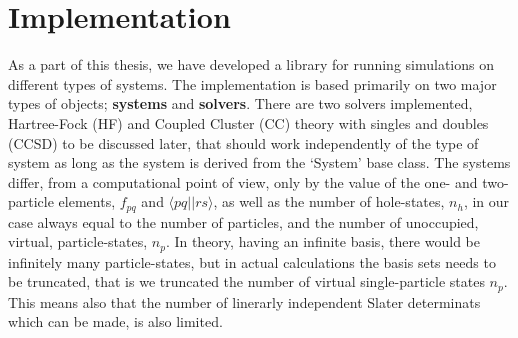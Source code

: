 \section{Implementation}
As a part of this thesis, we have developed a library for running simulations on different types of systems.
The implementation is based primarily on two major types of objects; {\bf systems} and {\bf solvers}.
There are two solvers implemented, Hartree-Fock (HF)  and Coupled Cluster (CC) theory with singles and doubles (CCSD) to be discussed later, that should work independently of the type of system as long as the system is derived from the `System' base class.
The systems differ, from a computational point of view, only by the value of the one- and two-particle elements, $f_{pq}$ and $\langle pq||rs \rangle$, as well as the number of hole-states, $n_h$, in our case always equal to the number of particles, and the number of unoccupied, virtual, particle-states, $n_p$.
In theory, having an infinite basis, there would be infinitely many particle-states, but in actual calculations the basis sets needs to be truncated, that is we truncated
the number of virtual single-particle states $n_p$.  This means also that the number of linerarly independent Slater determinats which can be made, is also limited.

